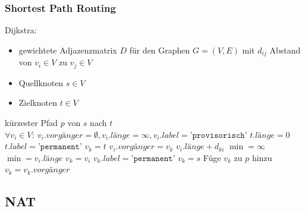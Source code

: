 \documentclass[a4paper,10pt]{scrartcl}
\begin{document}
\subsubsection{Shortest Path Routing}
Dijkstra:
\begin{algorithmic}
\REQUIRE 
\begin{itemize}
\setlength{\itemsep}{0pt}
\item   gewichtete Adjazenzmatrix $D$ für den Graphen $G = (V,E)$ mit $d_{ij}$ Abstand von $v_i \in V$ zu $v_j \in V$
\item   Quellknoten $s \in V$
\item   Zielknoten $t \in V$
\end{itemize}
\ENSURE kürzester Pfad $p$ von $s$ nach $t$
\STATE  {}
\STATE  {}
\STATE  {}
\STATE  {}
\STATE
\STATE  {}
\STATE  $\forall v_i \in V{:}\ v_i.\textit{vorgänger} = \emptyset, v_i.\textit{länge} = \infty, v_i.\textit{label} = \texttt{'provisorisch'}$
\STATE  $t.\textit{länge} = 0$
\STATE  $t.\textit{label} = \texttt{'permanent'}$
\STATE  $v_k = t$
\STATE  
{}
\REPEAT
                \STATE  $v_i.\textit{vorgänger} = v_k$
                \STATE  $v_i.\textit{länge} + d_{ki}$
            \ENDIF
        \ENDIF
    \ENDFOR
    \STATE
    $\min = \infty$
            \STATE  $\min = v_i.\textit{länge}$
            \STATE  $v_k = v_i$
        \ENDIF
        \STATE  $v_k.\textit{label} = \texttt{'permanent'}$
    \ENDFOR
{}
\STATE  
{}
\STATE  $v_k = s$
\REPEAT
    \STATE Füge $v_k$ zu $p$ hinzu
    \STATE $v_k = v_k.\textit{vorgänger}$
\end{algorithmic}

\subsection{NAT}
\end{document}

